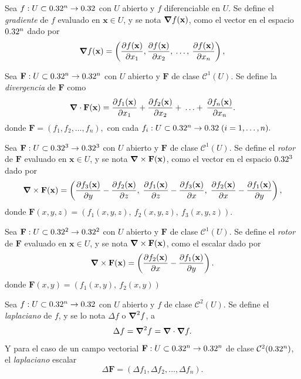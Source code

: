 \begin{definition}
    Sea $f:U\subset0.32^n\to0.32$ con $U$ abierto y $f$ diferenciable en $U$.   Se define el \emph{gradiente} de $f$ evaluado en $\mathbf{x}\in U$, y se nota $\grad f(\mathbf{x})$,  como el vector en el espacio $0.32^n$ dado por 
    \[
        \grad f(\mathbf{x})=\left(\frac{\partial f(\mathbf{x})}{\partial x_1},\frac{\partial f(\mathbf{x})}{\partial x_2},\:\ldots,\: \frac{\partial f(\mathbf{x})}{\partial x_n}\right),
    \]
  \end{definition}


\begin{definition}
    Sea $\mathbf{F}:U\subset0.32^n\to0.32^n$ con  $U$ abierto y $\mathbf{F}$ de clase $\mathcal{C}^1(U)$. Se define la \emph{divergencia} de $\mathbf{F}$ como
    \[
        \grad\cdot \mathbf{F}(\mathbf{x})=\frac{\partial f_1(\mathbf{x})}{\partial x_1}+\frac{\partial f_2(\mathbf{x})}{\partial x_2}+\:\ldots+\: \frac{\partial f_n(\mathbf{x})}{\partial x_n}.
    \]
    donde $\mathbf{F}=(f_1,f_2,\ldots,f_n),$ con cada $f_i :U\subset0.32^n \to0.32\;(i=1,\ldots,n).$
\end{definition}


\begin{definition}
    Sea $\mathbf{F}:U\subset0.32^3\to0.32^3$ con $U$ abierto y $\mathbf{F}$ de clase $\mathcal{C}^1(U)$. Se define el \emph{rotor} de $\mathbf{F}$  evaluado en $\mathbf{x}\in U$, y se nota  $\grad\times\mathbf{F}(\mathbf{x})$,   como el vector en el espacio $0.32^3$ dado por 
    \[
        \grad\times\mathbf{F}(\mathbf{x})=\left(\frac{\partial f_3(\mathbf{x})}{\partial y}-\frac{\partial f_2(\mathbf{x})}{\partial z},\;\frac{\partial f_1(\mathbf{x})}{\partial z}-\frac{\partial f_3(\mathbf{x})}{\partial x},\;\frac{\partial f_2(\mathbf{x})}{\partial x}-\frac{\partial f_1(\mathbf{x})}{\partial y}\right),
    \]   
    donde $\mathbf{F}(x,y,z)=(f_1(x,y,z),\:f_2(x,y,z),\:f_3(x,y,z))$.
  
  
    Sea $\mathbf{F}:U\subset0.32^2\to0.32^2$   con $U$ abierto y $\mathbf{F}$ de clase $\mathcal{C}^1(U)$. Se define el \emph{rotor} de $\mathbf{F}$  evaluado en $\mathbf{x}\in U$, y se nota  $\grad\times\mathbf{F}(\mathbf{x})$,   como el escalar dado por
    \[
        \grad\times\mathbf{F}(\mathbf{x})=\left(\frac{\partial f_2(\mathbf{x})}{\partial x}-\frac{\partial f_1(\mathbf{x})}{\partial y}\right).
    \]
     donde $\mathbf{F}(x,y)=(f_1(x,y),\:f_2(x,y))$
\end{definition}

\begin{definition}
    Sea $f:U\subset0.32^n\to0.32$ con  $U$ abierto y $f$ de clase $\mathcal{C}^2(U)$.  Se define el \emph{laplaciano} de $f$, y se lo nota $\Delta f$ o $\grad^2 f$, a
    \[
        \Delta f=\grad^2f=\grad\cdot\grad f.  
    \]
    Y para el caso de un campo vectorial $\mathbf{F}:U\subset0.32^n\to0.32^n$ de clase $\mathcal{C}^2(0.32^n)$, el \emph{laplaciano} escalar
    \[
        \Delta\mathbf{F}=(\Delta f_1,\Delta f_2,\ldots,\Delta f_n). 
    \]
\end{definition}


